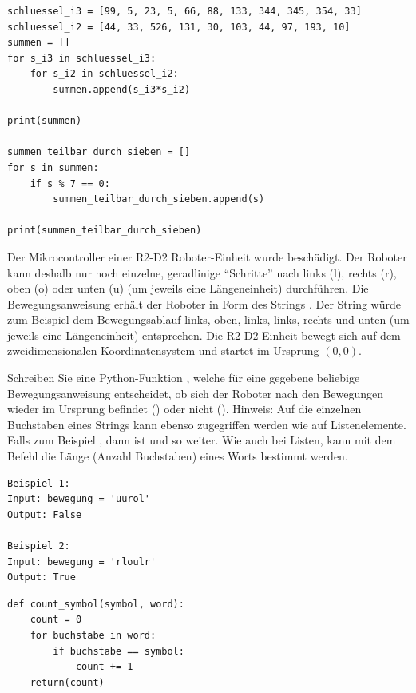 \begin{questions}
\begin{solution}
\begin{lstlisting}[style=TigerJython]
schluessel_i3 = [99, 5, 23, 5, 66, 88, 133, 344, 345, 354, 33]
schluessel_i2 = [44, 33, 526, 131, 30, 103, 44, 97, 193, 10]
summen = []
for s_i3 in schluessel_i3:
    for s_i2 in schluessel_i2:
        summen.append(s_i3*s_i2)

print(summen)

summen_teilbar_durch_sieben = []
for s in summen:
    if s % 7 == 0:
        summen_teilbar_durch_sieben.append(s)

print(summen_teilbar_durch_sieben)
\end{lstlisting}
\end{solution}

\clearpage
{}

Der Mikrocontroller einer R2-D2 Roboter-Einheit wurde beschädigt. Der Roboter kann deshalb nur noch einzelne, geradlinige \enquote{Schritte} nach links (l), rechts (r), oben (o) oder unten (u) (um jeweils eine Längeneinheit) durchführen. Die Bewegungsanweisung erhält der Roboter in Form des Strings . Der String  würde zum Beispiel dem Bewegungsablauf links, oben, links, links, rechts und unten (um jeweils eine Längeneinheit) entsprechen. Die R2-D2-Einheit bewegt sich auf dem zweidimensionalen Koordinatensystem und startet im Ursprung $(0,0)$.

\noindent
Schreiben Sie eine Python-Funktion , welche für eine gegebene beliebige Be\-we\-gungs\-an\-wei\-sung  entscheidet, ob sich der Roboter nach den Bewegungen wieder im Ursprung befindet () oder nicht (). Hinweis: Auf die einzelnen Buchstaben eines Strings kann ebenso zugegriffen werden wie auf Listenelemente. Falls zum Beispiel , dann ist  und so weiter. Wie auch bei Listen, kann mit dem Befehl  die Länge (Anzahl Buchstaben) eines Worts bestimmt werden.

\begin{lstlisting}[numbers=none,framexleftmargin=0em,xleftmargin=0em]
Beispiel 1:
Input: bewegung = 'uurol'
Output: False

Beispiel 2:
Input: bewegung = 'rloulr'
Output: True
\end{lstlisting}

\begin{solution}
\begin{lstlisting}[style=TigerJython]
def count_symbol(symbol, word):
    count = 0
    for buchstabe in word:
        if buchstabe == symbol:
            count += 1
    return(count)



\end{lstlisting}
\end{solution}
\end{questions}
